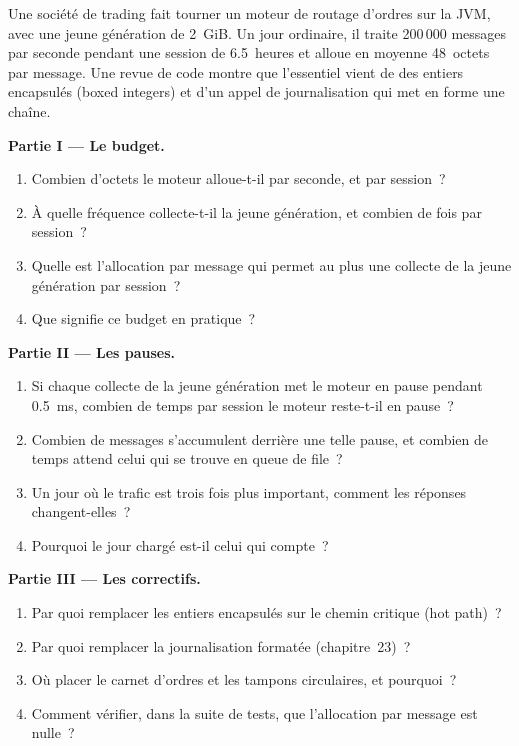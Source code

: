 \begin{problem}\label{pb:ll:managed-and-functional-languages-on-the-desk:1}
Une société de trading fait tourner un moteur de routage d'ordres sur la JVM, avec une jeune génération de 2~GiB. Un jour ordinaire, il traite 200\,000 messages par
seconde pendant une session de 6.5~heures et alloue en moyenne 48~octets par message. Une revue de code montre que l'essentiel vient de
des entiers encapsulés (boxed integers) et d'un appel de journalisation qui met en forme une chaîne.

\medskip\noindent\textbf{Partie I --- Le budget.}
\begin{enumerate}
\item Combien d'octets le moteur alloue-t-il par seconde, et par session~?
\item À quelle fréquence collecte-t-il la jeune génération, et combien de fois par session~?
\item Quelle est l'allocation par message qui permet au plus une collecte de la jeune génération par session~?
\item Que signifie ce budget en pratique~?
\end{enumerate}

\medskip\noindent\textbf{Partie II --- Les pauses.}
\begin{enumerate}[resume]
\item Si chaque collecte de la jeune génération met le moteur en pause pendant \qty{0.5}{\milli\second}, combien de temps par session le moteur reste-t-il en pause~?
\item Combien de messages s'accumulent derrière une telle pause, et combien de temps attend celui qui se trouve en queue de file~?
\item Un jour où le trafic est trois fois plus important, comment les réponses changent-elles~?
\item Pourquoi le jour chargé est-il celui qui compte~?
\end{enumerate}

\medskip\noindent\textbf{Partie III --- Les correctifs.}
\begin{enumerate}[resume]
\item Par quoi remplacer les entiers encapsulés sur le chemin critique (hot path)~?
\item Par quoi remplacer la journalisation formatée (chapitre~23)~?
\item Où placer le carnet d'ordres et les tampons circulaires, et pourquoi~?
\item Comment vérifier, dans la suite de tests, que l'allocation par message est nulle~?
\end{enumerate}


\end{problem}

